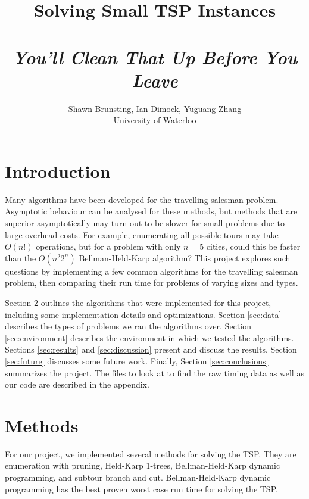 \documentclass[11pt]{article}
\begin{document}
	
	\thispagestyle{empty}
	
	\title{Solving Small TSP Instances \\ ~ \\ \textit{You'll Clean That Up Before You Leave}}
	
	\author{Shawn Brunsting, Ian Dimock, Yuguang Zhang \\ University of Waterloo}
	
	\maketitle
	
	
	\section{Introduction}
	
	Many algorithms have been developed for the travelling salesman problem. Asymptotic behaviour can be analysed for these methods, but methods that are superior asymptotically may turn out to be slower for small problems due to large overhead costs. For example, enumerating all possible tours may take $O(n!)$ operations, but for a problem with only $n=5$ cities, could this be faster than the $O(n^2 2^n)$ Bellman-Held-Karp algorithm? This project explores such questions by implementing a few common algorithms for the travelling salesman problem, then comparing their run time for problems of varying sizes and types.
	
	Section \ref{sec:methods} outlines the algorithms that were implemented for this project, including some implementation details and optimizations. Section \ref{sec:data} describes the types of problems we ran the algorithms over. Section \ref{sec:environment} describes the environment in which we tested the algorithms. Sections \ref{sec:results} and \ref{sec:discussion} present and discuss the results. Section \ref{sec:future} discusses some future work. Finally, Section \ref{sec:conclusions} summarizes the project. The files to look at to find the raw timing data as well as our code are described in the appendix.
	
	\section{Methods}
	\label{sec:methods}
	For our project, we implemented several methods for solving the TSP. They are enumeration with pruning, Held-Karp 1-trees, Bellman-Held-Karp dynamic programming, and subtour branch and cut. Bellman-Held-Karp dynamic programming has the best proven worst case run time for solving the TSP. 
\end{document}
